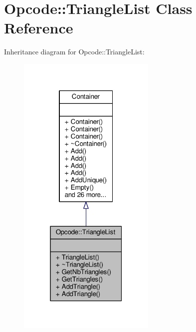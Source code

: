 \hypertarget{classOpcode_1_1TriangleList}{}\section{Opcode\+:\+:Triangle\+List Class Reference}
\label{classOpcode_1_1TriangleList}


Inheritance diagram for Opcode\+:\+:Triangle\+List\+:
\nopagebreak
\begin{figure}[H]
\begin{center}
\leavevmode
\includegraphics[width=187pt]{d2/d2b/classOpcode_1_1TriangleList__inherit__graph}
\end{center}
\end{figure}



